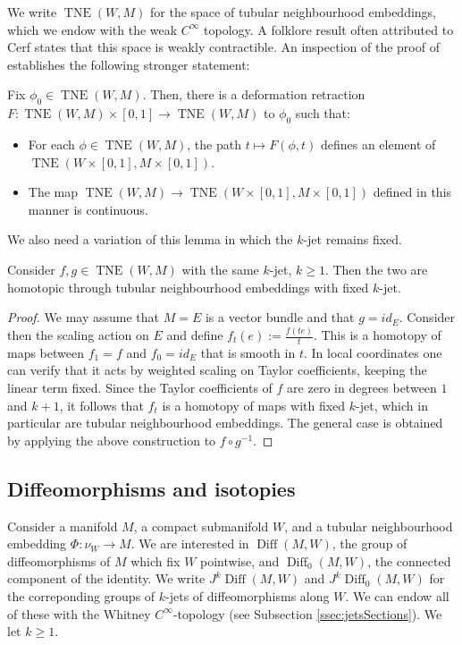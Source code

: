\documentclass[10pt]{amsart}
\newcommand{\Diff}{{\operatorname{Diff}}}
\newcommand{\TNE}{{\operatorname{TNE}}}
\numberwithin{theoremalpha}{section}
\numberwithin{equation}{section}
\numberwithin{definition}{section}
\numberwithin{theorem}{section}
\numberwithin{proposition}{section}
\numberwithin{lemma}{section}
\numberwithin{example}{section}
\numberwithin{remark}{section}
\numberwithin{corollary}{section}
\numberwithin{question}{section}
\numberwithin{problem}{section}
\numberwithin{assumption}{section}
\theoremstyle{named}
\numberwithin{equation}{section}
\begin{document}
We write $\TNE(W,M)$ for the space of tubular neighbourhood embeddings, which we endow with the weak $C^\infty$ topology. A folklore result often attributed to Cerf \cite{Cer61} states that this space is weakly contractible. An inspection of the proof of \cite[Proposition 31]{Godin} establishes the following stronger statement:
\begin{lemma} \label{lem:betterCerf}
Fix $\phi_0 \in \TNE(W,M)$. Then, there is a deformation retraction $F :  \TNE(W,M) \times [0,1] \to \TNE(W,M)$ to $\phi_0$ such that:
\begin{itemize}
    \item For each $\phi \in \TNE(W,M)$, the path $t \mapsto F(\phi,t)$ defines an element of $\TNE(W \times [0,1],M\times [0,1])$.
    \item The map $\TNE(W,M) \rightarrow \TNE(W \times [0,1], M\times [0,1])$ defined in this manner is continuous.
\end{itemize}
\end{lemma}

We also need a variation of this lemma in which the $k$-jet remains fixed.
\begin{lemma} \label{lem:dilating}
Consider $f,g \in \TNE(W,M)$ with the same $k$-jet, $k \geq 1$. Then the two are homotopic through tubular neighbourhood embeddings with fixed $k$-jet.
\end{lemma}
\begin{proof}
We may assume that $M=E$ is a vector bundle and that $g = id_E$. Consider then the scaling action on $E$ and define $f_t(e) := \frac{f(te)}{t}$. This is a homotopy of maps between $f_1 = f$ and $f_0 = id_E$ that is smooth in $t$.  In local coordinates one can verify that it acts by weighted scaling on Taylor coefficients, keeping the linear term fixed. Since the Taylor coefficients of $f$ are zero in degrees between $1$ and $k+1$, it follows that $f_t$ is a homotopy of maps with fixed $k$-jet, which in particular are tubular neighbourhood embeddings. The general case is obtained by applying the above construction to $f \circ g^{-1}$.
\end{proof}



\subsection{Diffeomorphisms and isotopies} \label{ssec:DiffeosAndIsotopies}

Consider a manifold $M$, a compact submanifold $W$, and a tubular neighbourhood embedding $\Phi: \nu_{W} \rightarrow M$. We are interested in $\Diff(M,W)$, the group of diffeomorphisms of $M$ which fix $W$ pointwise, and $\Diff_0(M,W)$, the connected component of the identity. We write $J^k\Diff(M,W)$ and $J^k\Diff_0(M,W)$ for the correponding groups of $k$-jets of diffeomorphisms along $W$. We can endow all of these with the Whitney $C^\infty$-topology (see Subsection \ref{ssec:jetsSections}). We let $k\geq 1$.
\end{document}

